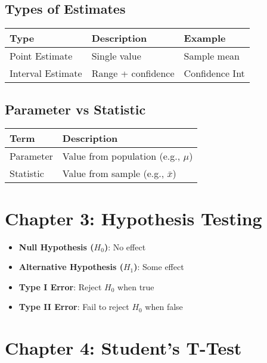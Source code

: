 \documentclass[
  letterpaper,
  DIV=11,
  numbers=noendperiod]{scrreprt}
\providecommand{\tightlist}{%
  \setlength{\itemsep}{0pt}\setlength{\parskip}{0pt}}
\begin{document}
\subsection{Types of Estimates}\label{types-of-estimates}

\begin{longtable}[]{@{}lll@{}}
\toprule\noalign{}
Type & Description & Example \\
\midrule\noalign{}
\endhead
\bottomrule\noalign{}
\endlastfoot
Point Estimate & Single value & Sample mean \\
Interval Estimate & Range + confidence & Confidence Int \\
\end{longtable}

\subsection{Parameter vs Statistic}\label{parameter-vs-statistic}

\begin{longtable}[]{@{}ll@{}}
\toprule\noalign{}
Term & Description \\
\midrule\noalign{}
\endhead
\bottomrule\noalign{}
\endlastfoot
Parameter & Value from population (e.g., \(\mu\)) \\
Statistic & Value from sample (e.g., \(\bar{x}\)) \\
\end{longtable}

\section{Chapter 3: Hypothesis
Testing}\label{chapter-3-hypothesis-testing}

\begin{itemize}
\tightlist
\item
  \textbf{Null Hypothesis (\(H_0\))}: No effect\\
\item
  \textbf{Alternative Hypothesis (\(H_1\))}: Some effect\\
\item
  \textbf{Type I Error}: Reject \(H_0\) when true\\
\item
  \textbf{Type II Error}: Fail to reject \(H_0\) when false
\end{itemize}

\section{Chapter 4: Student's T-Test}\label{chapter-4-students-t-test}
\end{document}
